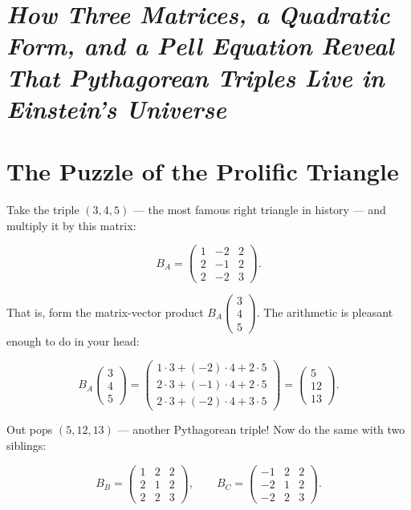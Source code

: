 \section{\texorpdfstring{\emph{How Three Matrices, a Quadratic Form, and a Pell Equation Reveal That Pythagorean Triples Live in Einstein's Universe}}{How Three Matrices, a Quadratic Form, and a Pell Equation Reveal That Pythagorean Triples Live in Einstein's Universe}}\label{ch5-how-three-matrices-a-quadratic-form-and-a-pell-equation-reveal-that-pythagorean-triples-live-in-einsteins-universe}



\section{The Puzzle of the Prolific Triangle}\label{ch5-the-puzzle-of-the-prolific-triangle}

Take the triple \((3, 4, 5)\) --- the most famous right triangle in history --- and multiply it by this matrix:

\[B_A = \begin{pmatrix} 1 & -2 & 2 \\ 2 & -1 & 2 \\ 2 & -2 & 3 \end{pmatrix}.\]

That is, form the matrix-vector product \(B_A \begin{pmatrix} 3 \\ 4 \\ 5 \end{pmatrix}\). The arithmetic is pleasant enough to do in your head:

\[B_A \begin{pmatrix} 3 \\ 4 \\ 5 \end{pmatrix} = \begin{pmatrix} 1\cdot3 + (-2)\cdot4 + 2\cdot5 \\ 2\cdot3 + (-1)\cdot4 + 2\cdot5 \\ 2\cdot3 + (-2)\cdot4 + 3\cdot5 \end{pmatrix} = \begin{pmatrix} 5 \\ 12 \\ 13 \end{pmatrix}.\]

Out pops \((5, 12, 13)\) --- another Pythagorean triple! Now do the same with two siblings:

\[B_B = \begin{pmatrix} 1 & 2 & 2 \\ 2 & 1 & 2 \\ 2 & 2 & 3 \end{pmatrix}, \qquad B_C = \begin{pmatrix} -1 & 2 & 2 \\ -2 & 1 & 2 \\ -2 & 2 & 3 \end{pmatrix}.\]

